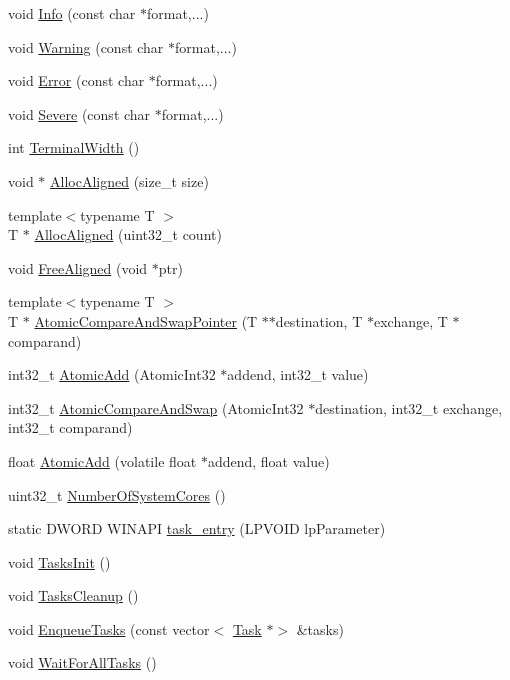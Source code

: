 \begin{DoxyCompactItemize}
\item 
void \hyperlink{namespacemage_add6aa5f13960ce07b20f48d273956a91}{Info} (const char $\ast$format,...)
\item 
void \hyperlink{namespacemage_a0eccd8065c75d5f2bf86b48a5be3bfe5}{Warning} (const char $\ast$format,...)
\item 
void \hyperlink{namespacemage_a52a7fe8c9ce39afd9e0b0299373db0fa}{Error} (const char $\ast$format,...)
\item 
void \hyperlink{namespacemage_a95c8b0820c579bbde59062fd9d05e4f4}{Severe} (const char $\ast$format,...)
\item 
int \hyperlink{namespacemage_a0c12a51bf3468b372932ffc1138a4ddc}{Terminal\+Width} ()
\item 
void $\ast$ \hyperlink{namespacemage_a7d706913bb9fb322c938cd3e4d8eaede}{Alloc\+Aligned} (size\+\_\+t size)
\item 
{\footnotesize template$<$typename T $>$ }\\T $\ast$ \hyperlink{namespacemage_ae2f31ba64620694aa0dfc8ca6e5d5941}{Alloc\+Aligned} (uint32\+\_\+t count)
\item 
void \hyperlink{namespacemage_a401c54df21447c491c527735647b5f80}{Free\+Aligned} (void $\ast$ptr)
\item 
{\footnotesize template$<$typename T $>$ }\\T $\ast$ \hyperlink{namespacemage_aed89242e67231f3ddef77bdc63b32b6c}{Atomic\+Compare\+And\+Swap\+Pointer} (T $\ast$$\ast$destination, T $\ast$exchange, T $\ast$comparand)
\item 
int32\+\_\+t \hyperlink{namespacemage_ad397e742fa7e3532686fd46bb50e8166}{Atomic\+Add} (Atomic\+Int32 $\ast$addend, int32\+\_\+t value)
\item 
int32\+\_\+t \hyperlink{namespacemage_a03da57cfa5ba14d4aa0472ae49ec5c7e}{Atomic\+Compare\+And\+Swap} (Atomic\+Int32 $\ast$destination, int32\+\_\+t exchange, int32\+\_\+t comparand)
\item 
float \hyperlink{namespacemage_a0de5ff6241a0474f4572c7c3ba342098}{Atomic\+Add} (volatile float $\ast$addend, float value)
\item 
uint32\+\_\+t \hyperlink{namespacemage_abc47a1cf24b1224ad55d8022a1f3b2dc}{Number\+Of\+System\+Cores} ()
\item 
static D\+W\+O\+RD W\+I\+N\+A\+PI \hyperlink{namespacemage_a1f113843a26e671776ec469adf7ccc51}{task\+\_\+entry} (L\+P\+V\+O\+ID lp\+Parameter)
\item 
void \hyperlink{namespacemage_a8252f7acebefd3efe34a15cc51e4a7ac}{Tasks\+Init} ()
\item 
void \hyperlink{namespacemage_a118ddaa5d9606328a0af412c85832e6b}{Tasks\+Cleanup} ()
\item 
void \hyperlink{namespacemage_a0f0fa32534696afa66b313ffebbf9caf}{Enqueue\+Tasks} (const vector$<$ \hyperlink{classmage_1_1_task}{Task} $\ast$$>$ \&tasks)
\item 
void \hyperlink{namespacemage_a7da78c39175a029c92ed42d8fb9f30af}{Wait\+For\+All\+Tasks} ()
\end{DoxyCompactItemize}

